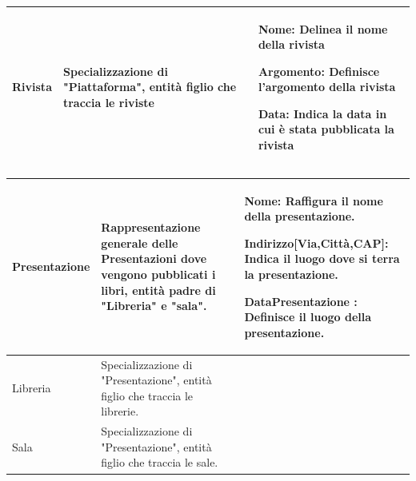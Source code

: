 \begin{center}
\begin{tabular}{ | m{5cm} | m{5cm}| m{6cm} | }
        
             Rivista & Specializzazione di "Piattaforma", entità figlio che traccia le riviste
             & {\bf Nome:} Delinea il nome della rivista\par
               {\bf Argomento:} Definisce l'argomento della rivista \par
               {\bf Data:} Indica la data in cui è stata pubblicata la rivista\par
                \\ 
        \hline
        \end{tabular}
       \begin{tabular}{ | m{5cm} | m{5cm}| m{6cm} | }   
       \hline
             Presentazione & Rappresentazione generale delle Presentazioni dove vengono pubblicati i libri, entità padre di "Libreria" e "sala".
             & 
             {\bf Nome:} Raffigura il nome della presentazione.\par 
             {\bf  Indirizzo{\large[Via,Città,CAP]:}} Indica il luogo dove si terra la presentazione.\par 
             {\bf DataPresentazione :} Definisce il luogo della presentazione.\par 
             \\ 
        \hline
             Libreria & Specializzazione di "Presentazione", entità figlio che traccia le librerie. & \\ 
        \hline
             Sala & Specializzazione di "Presentazione", entità figlio che traccia le sale. & \\ 
       \hline


\end{tabular}
\end{center}
